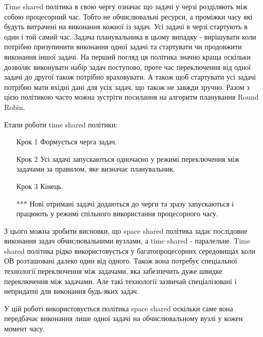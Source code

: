 Time shared політика в свою чергу означає що задачі у черзі розділяють між собою процесорний час. Тобто не обчислювальні ресурси, а проміжки часу які будуть витрачені на виконання кожної із задач. Усі задачі в черзі стартують в один і той самий час. Задача планувальника в цьому випадку - вирішувати коли потрібно призупинити виконання одної задачі та стартувати чи продовжити виконання іншої задачі. На перший погляд ця політика значно краща оскільки дозволяє виконувати набір задач поступово, проте час переключення від одної задачі до другої також потрібно враховувати. А також щоб стартувати усі задачі потрібно мати вхідні дані для усіх задач, що також не завжди зручно. Разом з цією політикою часто можна зустріти посилання на алгоритм планування Round Robin.

Етапи роботи time shared політики:
\begin{itemize}
	\item[Крок 1] Формується черга задач.
	\item[Крок 2] Усі задачі запускаються одночасно у режимі переключення між задачами за правилом, яке визначає планувальник.
	\item[Крок 3] Кінець.
	\item[***] Нові отримані задачі додаються до черги та зразу запускаються і працюють у режимі спільного використання процесорного часу.
\end{itemize}

З цього можна зробити висновки, що space shared політика задає послідовне виконання задач обчислювальними вузлами, а time shared - паралельне. Time shared політика рідко використовується у багатопроцесорних середовищах коли ОВ розташовані далеко один від одного. Також вона потребує спеціальної технології переключення між задачами, яка забезпечить дуже швидке переключення між задачами. Але такі технології зазвичай спеціалізовані і непридатні для виконання будь-яких задач.

У цій роботі використовується політика space shared оскільки саме вона передбачає виконання лише одної задачі на обчислювальному вузлі у кожен момент часу.

